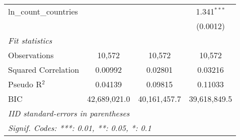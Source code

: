\begin{tabular}{lccc}
   ln\_count\_countries        &                &                 & 1.341$^{***}$\\   
                               &                &                 & (0.0012)\\   
   \midrule
   \emph{Fit statistics}\\
   Observations                & 10,572         & 10,572          & 10,572\\  
   Squared Correlation         & 0.00992        & 0.02801         & 0.03216\\  
   Pseudo R$^2$                & 0.04139        & 0.09815         & 0.11033\\  
   BIC                         & 42,689,021.0   & 40,161,457.7    & 39,618,849.5\\  
   \midrule \midrule
   \multicolumn{4}{l}{\emph{IID standard-errors in parentheses}}\\
   \multicolumn{4}{l}{\emph{Signif. Codes: ***: 0.01, **: 0.05, *: 0.1}}\\
\end{tabular}
\par\endgroup


